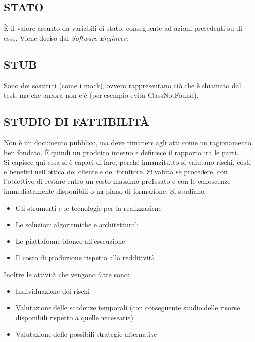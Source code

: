 		\subsection{STATO}  \label{stato}
		È il valore assunto da variabili di stato, conseguente ad azioni precedenti su di esse. Viene deciso dal \textit{Software Engineer}.

		\subsection{STUB}		\label{stub}
		Sono dei sostituti (come i \underline{\hyperref[mock]{mock}}), ovvero rappresentano ciò che è chiamato dal test, ma che ancora non c'è (per esempio evita ClassNotFound).

		\subsection{STUDIO DI FATTIBILITÀ}  \label{studiofattibilita}
		Non è un documento pubblico, ma deve rimanere agli atti come un ragionamento ben fondato.
		È quindi un prodotto interno e definisce il rapporto tra le parti. \\
		Si capisce qui cosa si è capaci di fare, perché innanzitutto si valutano rischi, costi e benefici nell'ottica del cliente e del fornitore.
		Si valuta se procedere, con l’obiettivo di restare entro un costo massimo prefissato e con le conoscenze immediatamente disponibili o un piano di formazione.
		Si studiano:
		\begin{itemize}
			\item Gli strumenti e le tecnologie per la realizzazione
			\item Le soluzioni algoritmiche e architetturali
			\item Le piattaforme idonee all'esecuzione
			\item Il costo di produzione rispetto alla redditività
		\end{itemize}
		Inoltre le attività che vengono fatte sono:
		\begin{itemize}
			\item Individuazione dei rischi
			\item Valutazione delle scadenze temporali (con conseguente studio delle risorse disponibili rispetto a quelle necessarie)
			\item Valutazione delle possibili strategie alternative
		\end{itemize}
